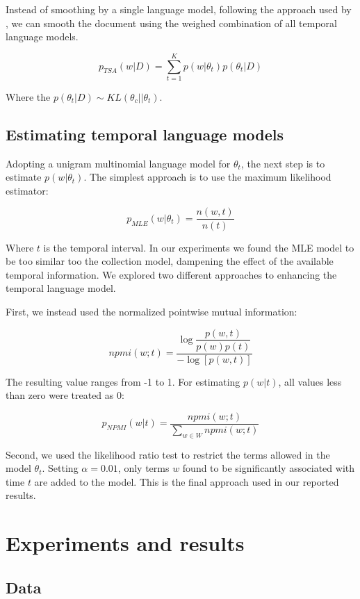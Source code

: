 \documentclass{sig-alternate}
\begin{document}
Instead of smoothing by a single language model, following the approach used by \cite{Wei2006}, we can smooth the document using the weighed combination of all temporal language models.

\[
p_{TSA}(w \vert D)= \sum_{t=1}^{K} p(w \vert \theta_t) p(\theta_t \vert D)
\]

Where the $p(\theta_t \vert D) \sim KL(\theta_c \vert\vert \theta_t)$.


\subsection{Estimating temporal language models}

Adopting a unigram multinomial language model for $\theta_t$, the next step is to estimate $p(w \vert \theta_t)$.  
The simplest approach is to use the maximum likelihood estimator:

\[
p_{MLE} (w \vert \theta_t) = \dfrac{n(w, t)}{n(t)}
\]

Where $t$ is the temporal interval. In our experiments we found the MLE model to be too similar too 
the collection model, dampening the effect of the available temporal information. We explored two
different approaches to enhancing the temporal language model.  

First, we instead used the normalized pointwise mutual information:

\[
npmi(w;t) = \dfrac{\log \dfrac{p(w,t)}{p(w)p(t)}}{-\log[p(w,t)]}
\]

The resulting value ranges from -1 to 1. For estimating $p(w \vert t)$, all values less than zero were treated as 0:

\[
p_{NPMI} (w \vert t) = \dfrac{npmi(w;t)}{\sum_{w \in W} npmi(w; t)}
\]

Second, we used the likelihood ratio test to restrict the terms allowed in the model $\theta_t$. Setting $\alpha=0.01$, 
only terms $w$ found to be significantly associated with time $t$ are added to the model. This is the final approach
used in our reported results.

\section{Experiments and results}
\subsection{Data}
\end{document}
